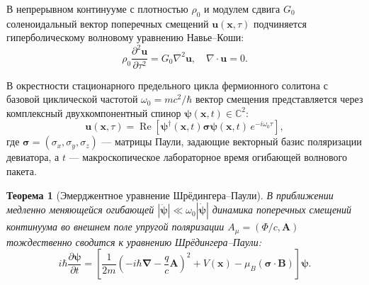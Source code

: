 \documentclass[11pt,a4paper]{article}
\newtheorem{theorem}{Теорема}[section]
\theoremstyle{definition}
\theoremstyle{remark}
\begin{document}
В непрерывном континууме с плотностью $\rho_0$ и модулем сдвига $G_0$ соленоидальный вектор поперечных смещений $\mathbf{u}(\mathbf{x}, \tau)$ подчиняется гиперболическому волновому уравнению Навье--Коши:
\begin{equation}
    \rho_0 \frac{\partial^2 \mathbf{u}}{\partial \tau^2} = G_0 \nabla^2 \mathbf{u}, \quad \nabla \cdot \mathbf{u} = 0.
    \label{eq:navier_cauchy_transverse}
\end{equation}

В окрестности стационарного предельного цикла фермионного солитона с базовой циклической частотой $\omega_0 = m c^2 / \hbar$ вектор смещения представляется через комплексный двухкомпонентный спинор $\boldsymbol{\psi}(\mathbf{x}, t) \in \mathbb{C}^2$:
\begin{equation}
    \mathbf{u}(\mathbf{x}, \tau) = \operatorname{Re}\left[ \boldsymbol{\psi}^\dagger(\mathbf{x}, t) \boldsymbol{\sigma} \boldsymbol{\psi}(\mathbf{x}, t) \, e^{-i \omega_0 \tau} \right],
    \label{eq:spinor_ansatz_full}
\end{equation}
где $\boldsymbol{\sigma} = (\sigma_x, \sigma_y, \sigma_z)$ --- матрицы Паули, задающие векторный базис поляризации девиатора, а $t$ --- макроскопическое лабораторное время огибающей волнового пакета.

\begin{theorem}[Эмерджентное уравнение Шрёдингера--Паули]
В приближении медленно меняющейся огибающей $|\ddot{\boldsymbol{\psi}}| \ll \omega_0 |\dot{\boldsymbol{\psi}}|$ динамика поперечных смещений континуума во внешнем поле упругой поляризации $A_\mu = (\Phi/c, \mathbf{A})$ тождественно сводится к уравнению Шрёдингера--Паули:
\begin{equation}
    i \hbar \frac{\partial \boldsymbol{\psi}}{\partial t} = \left[ \frac{1}{2m} \left( -i\hbar \boldsymbol{\nabla} - \frac{q}{c}\mathbf{A} \right)^2 + V(\mathbf{x}) - \mu_B (\boldsymbol{\sigma} \cdot \mathbf{B}) \right] \boldsymbol{\psi}.
    \label{eq:pauli_equation_derived}
\end{equation}
\end{theorem}
\end{document}
